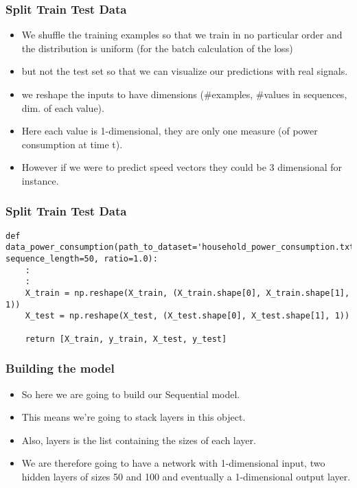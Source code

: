 \begin{frame}[fragile] \frametitle{Split Train Test Data}
\begin{itemize}
\item We shuffle the training examples so that we train in no particular order and the distribution is uniform (for the batch calculation of the loss) 
\item but not the test set so that we can visualize our predictions with real signals.
\item we reshape the inputs to have dimensions (\#examples, \#values in sequences, dim. of each value). 
\item Here each value is 1-dimensional, they are only one measure (of power consumption at time t). 
\item However if we were to predict speed vectors they could be 3 dimensional for instance.
\end{itemize}
\end{frame}

\begin{frame}[fragile] \frametitle{Split Train Test Data}

\begin{lstlisting}
def data_power_consumption(path_to_dataset='household_power_consumption.txt', sequence_length=50, ratio=1.0):
	:
	:
    X_train = np.reshape(X_train, (X_train.shape[0], X_train.shape[1], 1))
    X_test = np.reshape(X_test, (X_test.shape[0], X_test.shape[1], 1))
    
    return [X_train, y_train, X_test, y_test]
\end{lstlisting}
\end{frame}


\begin{frame}[fragile] \frametitle{Building the model}
\begin{itemize}
\item So here we are going to build our Sequential model. 
\item This means we're going to stack layers in this object.
\item Also, layers is the list containing the sizes of each layer.
\item We are therefore going to have a network with 1-dimensional input, two hidden layers of sizes 50 and 100 and eventually a 1-dimensional output layer.
\end{itemize}
\end{frame}

